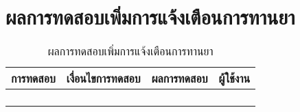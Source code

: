 \section{ผลการทดสอบเพิ่มการแจ้งเตือนการทานยา}
\begin{table}[H]
	\caption{ผลการทดสอบเพิ่มการแจ้งเตือนการทานยา}
    \centering	
	\label{tab:test28}
    \begin{tabular}{ | p{4cm} | p{4cm} | p{4cm} | p{2cm} | }
		\hline
	\multicolumn{1}{|c|}{การทดสอบ} & \multicolumn{1}{c|}{เงื่อนไขการทดสอบ} & \multicolumn{1}{c|}{ผลการทดสอบ} & \multicolumn{1}{c|}{ผู้ใช้งาน}                             \\ \hline
	\setstretch{1.0}{ทดสอบเพิ่มการแจ้งเตือนการทานยา}
	& \setstretch{1.0}{ผู้ใช้เลือกประเภท กรอกชื่อยา กรอกจำนวน เลือกช่วงเวลา และกดบันทึกข้อมูลยา}
	& \setstretch{1.0}{ระบบจะบันทึกข้อมูล และแสดงข้อความ  บันทึกข้อมูลยาเรียบร้อยแล้ว } 
	&\setstretch{1.0}{\begin{flushleft}ผู้ใช้งาน\end{flushleft}} \\ \cline{2-3} 
	& \setstretch{1.0}{ผู้ใช้ไม่กรอกข้อมูล และกดบันทึกข้อมูลยา}
	& \setstretch{1.0}{ระบบจะแสดงข้อความ  กรอกข้อมูลให้ถูกต้อง  } 
	&\setstretch{1.0}{}\\ \cline{2-3} 
	& \setstretch{1.0}{ผู้ใช้เลือกตั้งเวลาแจ้งเตือน}
	& \setstretch{1.0}{ระบบจะแสดงรูปแบบเวลาแบบ 24 Hrs } 
	&\setstretch{1.0}{}\\ \cline{2-3} 
	& \setstretch{1.0}{ผู้ใช้เลือกประเภท}
	& \setstretch{1.0}{ระบบจะให้เลือกได้ 2 ประเภท ได้แก่ สำหรับรับประทาน และ สำหรับฉีด } 
	&\setstretch{1.0}{}\\ \cline{2-3} \hline
    \end{tabular}
\end{table}

